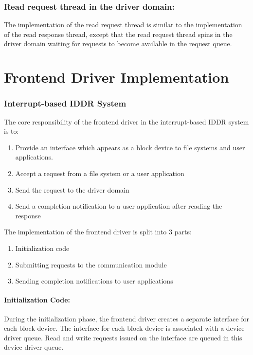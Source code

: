 \subsubsection*{Read request thread in the driver domain:}
The implementation of the read request thread is similar to
the implementation of the read response thread, except that the read request thread
spins in the driver domain waiting for requests to become available 
in the request queue.

\section{Frontend Driver Implementation}

\subsubsection*{Interrupt-based IDDR System}
The core responsibility of the frontend driver in the interrupt-based IDDR system is to:
\begin{enumerate}
\item Provide an interface which appears as a block device to file systems and user applications.
\item Accept a request from a file system or a user application
\item Send the request to the driver domain
\item Send a completion notification to a user application after reading the response
\end{enumerate}

The implementation of the frontend driver is split into 3 parts: 
\begin{enumerate}
\item Initialization code
\item Submitting requests to the communication module
\item Sending completion notifications to user applications
\end{enumerate}

\paragraph{Initialization Code:}
During the initialization phase, the frontend driver creates a separate
interface for each block device. The interface for each block device is
associated with a device driver queue. Read and write requests issued
on the interface are queued in this device driver queue.

